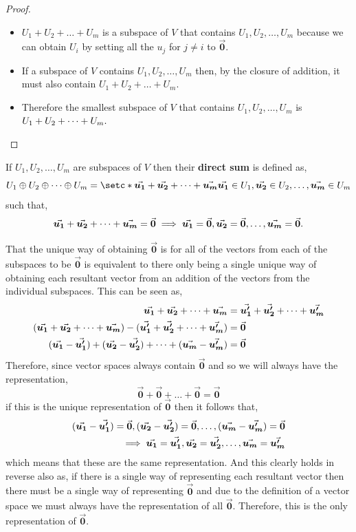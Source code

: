 \documentclass[MathsNotesBase.tex]{subfiles}
\def\0{\vec{\bm{0}}}
\begin{document}
{		\bigskip
		\begin{proof}
		\begin{itemize}[label={}]
		\item{$U_1 + U_2 + \dots + U_m$ is a subspace of $V$ that contains $U_1,U_2,\dots,U_m$ because we can obtain $U_i$ by setting all the $u_j$ for $j \neq i$ to $\0$.}
		\item{If a subspace of $V$ contains $U_1,U_2,\dots,U_m$ then, by the closure of addition, it must also contain $U_1 + U_2 + \dots + U_m$.}
		\item{Therefore the smallest subspace of $V$ that contains $U_1,U_2,\dots,U_m$ is $U_1 + U_2 + \dots + U_m. \qedhere$}
		\end{itemize}
		\end{proof}
		
		\bigskip
		\begin{definition}
		If $U_1,U_2,\dots,U_m$ are subspaces of $V$ then their \textbf{direct sum} is defined as,
		\[ \textstyle{U_1 \oplus U_2 \oplus \dots \oplus U_m} =  \setc*{ \V{u_1} + \V{u_2} + \dots + \V{u_m} }{ \V{u_1} \in U_1, \V{u_2} \in U_2, \dots , \V{u_m} \in U_m } \]
		such that,
		\[ \V{u_1} + \V{u_2} + \dots + \V{u_m} = \0 \implies \V{u_1} = \0, \V{u_2} = \0, \dots , \V{u_m} = \0. \]
		\end{definition}
		That the unique way of obtaining $\0$ is for all of the vectors from each of the subspaces to be $\0$ is equivalent to there only being a single unique way of obtaining each resultant vector from an addition of the vectors from the individual subspaces. This can be seen as,
		\begin{align*}
		\V{u_1} + \V{u_2} + \dots + \V{u_m} &= \V{u_1'} + \V{u_2'} + \dots + \V{u_m'}\\
		(\V{u_1} + \V{u_2} + \dots + \V{u_m}) - (\V{u_1'} + \V{u_2'} + \dots + \V{u_m'}) &= \0\\
		(\V{u_1} - \V{u_1'}) + (\V{u_2} - \V{u_2'}) + \dots + (\V{u_m} - \V{u_m'}) &= \0
		\end{align*}
		Therefore, since vector spaces always contain $\0$ and so we will always have the representation,
		\[ \0 + \0 + \dots + \0 = \0 \]
		if this is the unique representation of $\0$ then it follows that,
		\begin{align*}
		(\V{u_1} - \V{u_1'}) = \0, (\V{u_2} - \V{u_2'}) = \0, \dots, (\V{u_m} - \V{u_m'}) = \0 \\
		\implies \V{u_1} = \V{u_1'}, \V{u_2} = \V{u_2'}, \dots, \V{u_m} = \V{u_m'}
		\end{align*}
		which means that these are the same representation. And this clearly holds in reverse also as, if there is a single way of representing each resultant vector then there must be a single way of representing $\0$ and due to the definition of a vector space we must always have the representation of all $\0$. Therefore, this is the only representation of $\0$.
		
}
\end{document}
